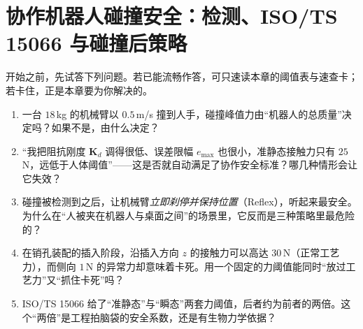 \chapter{协作机器人碰撞安全：检测、ISO/TS 15066 与碰撞后策略}\label{ch:arm-collision-safety}


\begin{practice}[前置自测]
开始之前，先试答下列问题。若已能流畅作答，可只速读本章的阈值表与速查卡；若卡住，正是本章要为你解决的。
\begin{enumerate}
  \item 一台 $18$\,kg 的机械臂以 $0.5$\,m/s 撞到人手，碰撞峰值力由“机器人的总质量”决定吗？如果不是，由什么决定？
  \item “我把阻抗刚度 $\mathbf K_d$ 调得很低、误差限幅 $e_{\max}$ 也很小，准静态接触力只有 $25$\,N，远低于人体阈值”——这是否就自动满足了协作安全标准？哪几种情形会让它失效？
  \item 碰撞被检测到之后，让机械臂\emph{立即刹停并保持位置}（Reflex），听起来最安全。为什么在“人被夹在机器人与桌面之间”的场景里，它反而是三种策略里最危险的？
  \item 在销孔装配的插入阶段，沿插入方向 $z$ 的接触力可以高达 $30$\,N（正常工艺力），而侧向 $1$\,N 的异常力却意味着卡死。用一个固定的力阈值能同时“放过工艺力”又“抓住卡死”吗？
  \item ISO/TS 15066 给了“准静态”与“瞬态”两套力阈值，后者约为前者的两倍。这个“两倍”是工程拍脑袋的安全系数，还是有生物力学依据？
\end{enumerate}
\end{practice}

